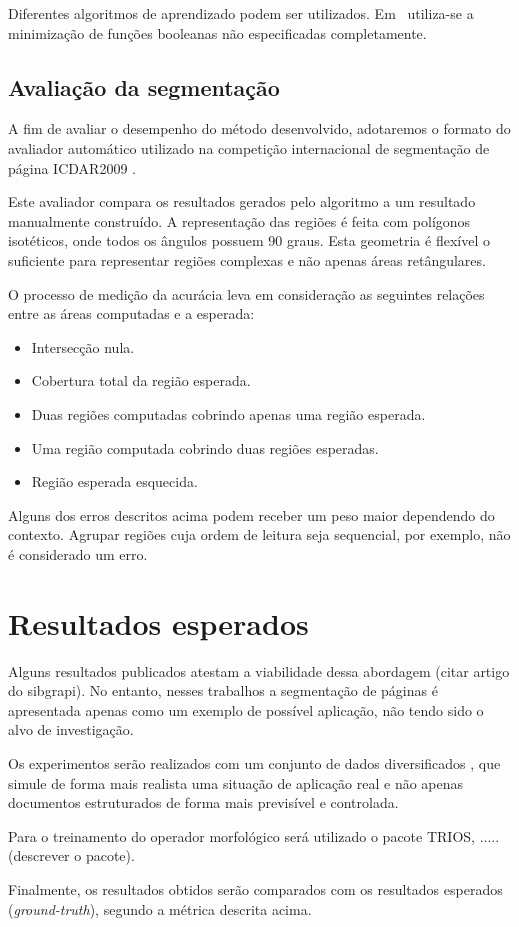 \documentclass[times, 10pt,twocolumn]{article}
\begin{document}
Diferentes algoritmos de aprendizado podem ser
utilizados. Em~\cite{Tomita:1996:PrAuMa} utiliza-se a minimização de
funções booleanas não especificadas completamente.


\subsection{Avaliação da segmentação}

A fim de avaliar o desempenho do método desenvolvido, adotaremos o formato do avaliador automático
utilizado na competição internacional de segmentação de página ICDAR2009 \cite{DBLP:conf/icdar/2009}.

Este avaliador compara os resultados gerados pelo algoritmo a um resultado manualmente construído.
A representação das regiões é feita com polígonos isotéticos, onde todos os ângulos possuem 90 graus.
Esta geometria é flexível o suficiente para representar regiões complexas e não apenas áreas retângulares.


O processo de medição da acurácia leva em consideração as seguintes relações entre as áreas computadas
e a esperada:

\begin{itemize}
	\item Intersecção nula.
	\item Cobertura total da região esperada.
	\item Duas regiões computadas cobrindo apenas uma região esperada.
	\item Uma região computada cobrindo duas regiões esperadas.
	\item Região esperada esquecida.
\end{itemize}

Alguns dos erros descritos acima podem receber um peso maior dependendo do contexto. Agrupar regiões
cuja ordem de leitura seja sequencial, por exemplo, não é considerado um erro.

\section{Resultados esperados}

Alguns resultados publicados atestam a viabilidade dessa abordagem
(citar artigo do sibgrapi). No entanto, nesses trabalhos a segmentação
de páginas é apresentada apenas como um exemplo de possível aplicação,
não tendo sido o alvo de investigação.

Os experimentos serão realizados com um conjunto de dados diversificados \cite{Antonacopoulos09arealistic}, 
que simule de forma mais realista uma situação de aplicação real e não apenas documentos estruturados
de forma mais previsível e controlada.

Para o treinamento do operador morfológico será utilizado o pacote
TRIOS, ..... (descrever o pacote).

Finalmente, os resultados obtidos serão comparados com os resultados
esperados (\emph{ground-truth}), segundo a métrica descrita acima.


{\small 
}
\end{document}
